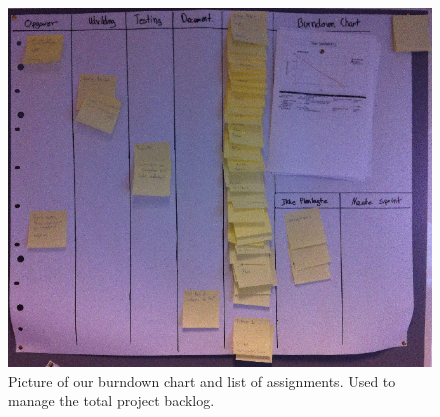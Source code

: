 	\begin{figure}[H]
		\centering
			\includegraphics[width=\textwidth]{Images/burndown.png}
				\caption{Picture of our burndown chart and list of assignments. Used to manage the total project backlog.}
		\label{fig:burn}
	\end{figure}
	
